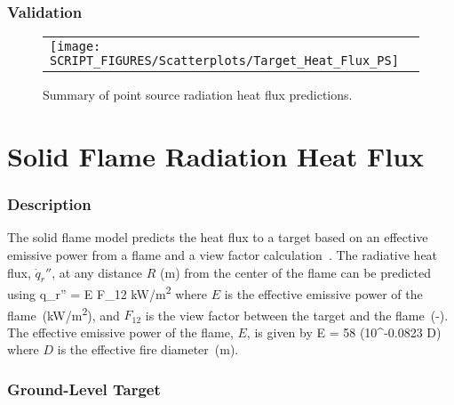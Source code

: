 \subsubsection*{Validation}

\begin{figure}[!ht]
\begin{center}
\begin{tabular}{l}
\texttt{[image: SCRIPT\_FIGURES/Scatterplots/Target\_Heat\_Flux\_PS]}
\end{tabular}
\end{center}
\caption[Summary of point source radiation heat flux predictions]
{Summary of point source radiation heat flux predictions.}
\label{Heat_Flux_Point_Source_Summary}
\end{figure}


\clearpage


\section{Solid Flame Radiation Heat Flux}

\subsubsection*{Description}

The solid flame model predicts the heat flux to a target based on an effective emissive power from a flame and a view factor calculation~\cite{Beyler2:SFPE}.
The radiative heat flux, $\dot q_r''$, at any distance $R$ (\si{m}) from the center of the flame can be predicted using
\be
\dot q_r'' = E F_{12} \quad \si{kW/m^2}
\label{eq:solid_flame}
\ee
where $E$ is the effective emissive power of the flame~(\si{kW/m^2}), and $F_{12}$ is the view factor between the target and the flame~(-).
The effective emissive power of the flame, $E$, is given by
\be
E = 58 (10^{-0.0823 D})
\label{eq:solid_flame_E}
\ee
where $D$ is the effective fire diameter~(\si{m}).

\subsubsection*{Ground-Level Target}

